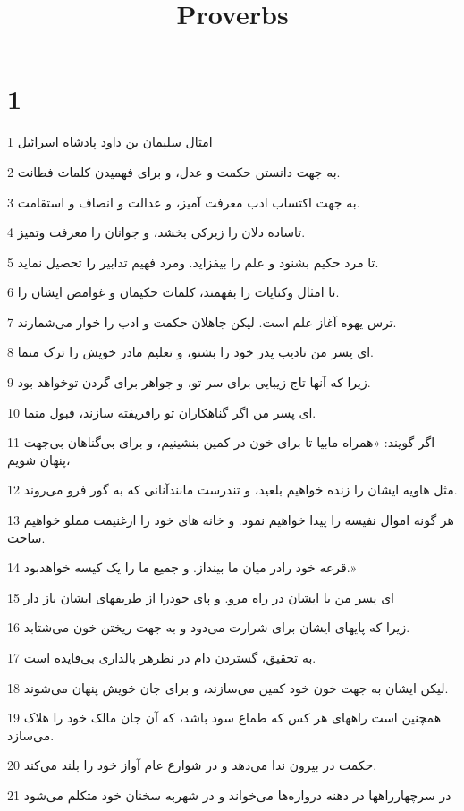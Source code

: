 

\title{Proverbs}

 
\chapter{1}

\par 1 امثال سلیمان بن داود پادشاه اسرائیل
\par 2 به جهت دانستن حکمت و عدل، و برای فهمیدن کلمات فطانت.
\par 3 به جهت اکتساب ادب معرفت آمیز، و عدالت و انصاف و استقامت.
\par 4 تاساده دلان را زیرکی بخشد، و جوانان را معرفت وتمیز.
\par 5 تا مرد حکیم بشنود و علم را بیفزاید. ومرد فهیم تدابیر را تحصیل نماید.
\par 6 تا امثال وکنایات را بفهمند، کلمات حکیمان و غوامض ایشان را.
\par 7 ترس یهوه آغاز علم است. لیکن جاهلان حکمت و ادب را خوار می‌شمارند.
\par 8 ‌ای پسر من تادیب پدر خود را بشنو، و تعلیم مادر خویش را ترک منما.
\par 9 زیرا که آنها تاج زیبایی برای سر تو، و جواهر برای گردن توخواهد بود.
\par 10 ‌ای پسر من اگر گناهکاران تو رافریفته سازند، قبول منما.
\par 11 اگر گویند: «همراه مابیا تا برای خون در کمین بنشینیم، و برای بی‌گناهان بی‌جهت پنهان شویم،
\par 12 مثل هاویه ایشان را زنده خواهیم بلعید، و تندرست مانندآنانی که به گور فرو می‌روند.
\par 13 هر گونه اموال نفیسه را پیدا خواهیم نمود. و خانه های خود را ازغنیمت مملو خواهیم ساخت.
\par 14 قرعه خود رادر میان ما بینداز. و جمیع ما را یک کیسه خواهدبود.»
\par 15 ‌ای پسر من با ایشان در راه مرو. و پای خودرا از طریقهای ایشان باز دار
\par 16 زیرا که پایهای ایشان برای شرارت می‌دود و به جهت ریختن خون می‌شتابد.
\par 17 به تحقیق، گستردن دام در نظرهر بالداری بی‌فایده است.
\par 18 لیکن ایشان به جهت خون خود کمین می‌سازند، و برای جان خویش پنهان می‌شوند.
\par 19 همچنین است راههای هر کس که طماع سود باشد، که آن جان مالک خود را هلاک می‌سازد.
\par 20 حکمت در بیرون ندا می‌دهد و در شوارع عام آواز خود را بلند می‌کند.
\par 21 در سرچهارراهها در دهنه دروازه‌ها می‌خواند و در شهربه سخنان خود متکلم می‌شود
